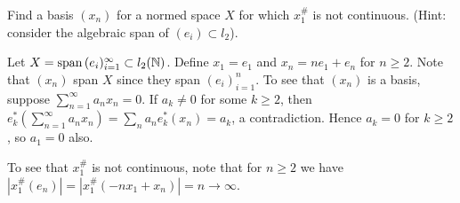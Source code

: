 \documentclass{article}
\begin{document}
 Find a basis $(x_n)$ for a normed space $X$ for which $x_1^\#$ is not continuous. (Hint: consider the algebraic span of $(e_i) \subset l_2$).

Let $X = \operatorname{span}{(e_i)_{i=1}^\infty} \subset l_2 ( \mathbb{N} )$.  Define $x_1 = e_1$ and $x_n = n e_1 + e_n$ for $n \ge 2$.  Note that $(x_n)$ span $X$ since they span $(e_i)_{i=1}^n$.  To see that $(x_n)$ is a basis, suppose $\sum_{n=1}^\infty a_n x_n = 0$.  If $a_k \neq 0$ for some $k \ge 2$, then $e_k^*(\sum_{n=1}^\infty a_n x_n) = \sum_n a_n e_k^*(x_n) = a_k$, a contradiction.  Hence $a_k = 0$ for $k \ge 2$, so $a_1 = 0$ also.

To see that $x_1^\#$ is not continuous, note that for $n \ge 2$ we have $|x_1^\# (e_n)|  = |x_1^\# (-n x_1 + x_n)| = n \to \infty$.







\end{document}

